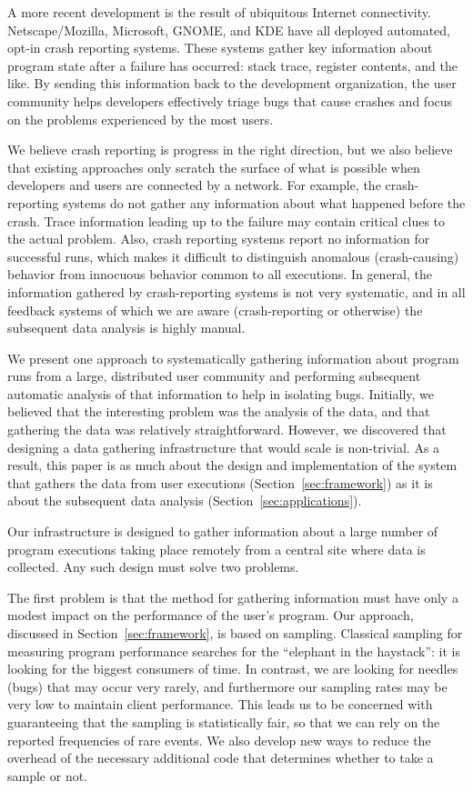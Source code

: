 A more recent development is the result of ubiquitous Internet
connectivity.  Netscape/Mozilla, Microsoft, GNOME, and KDE have all
deployed automated, opt-in crash reporting systems.  These systems
gather key information about program state after a failure has
occurred: stack trace, register contents, and the like.  By sending
this information back to the development organization, the user
community helps developers effectively triage bugs that cause crashes
and focus on the problems experienced by the most users.

We believe crash reporting is progress in the right direction, but we
also believe that existing approaches only scratch the surface of what
is possible when developers and users are connected by a network.  For
example, the crash-reporting systems do not gather any information
about what happened before the crash.  Trace information leading up to
the failure may contain critical clues to the actual problem.  Also,
crash reporting systems report no information for successful runs,
which makes it difficult to distinguish anomalous (crash-causing)
behavior from innocuous behavior common to all executions.  In general, the
information gathered by crash-reporting systems is not very
systematic, and in all feedback systems of which we are aware
(crash-reporting or otherwise) the subsequent data analysis is highly
manual.

We present one approach to systematically gathering information about
program runs from a large, distributed user community and performing
subsequent automatic analysis of that information to help in isolating
bugs.  Initially, we believed that the interesting problem was the
analysis of the data, and that gathering the data was relatively
straightforward.  However, we discovered that designing a data
gathering infrastructure that would scale is non-trivial.  As a
result, this paper is as much about the design and implementation of
the system that gathers the data from user executions
(Section~\ref{sec:framework}) as it is about the subsequent data
analysis (Section~\ref{sec:applications}).

Our infrastructure is designed to gather information about a large
number of program executions taking place remotely from a central site
where data is collected.  Any such design must solve two problems.

The first problem is that the method for gathering information must
have only a modest impact on the performance of the user's program.
Our approach, discussed in Section~\ref{sec:framework}, is based on
sampling.  Classical sampling for measuring program performance
searches for the ``elephant in the haystack'': it is looking for the
biggest consumers of time.  In contrast, we are looking for needles
(bugs) that may occur very rarely, and furthermore our sampling rates
may be very low to maintain client performance.  This leads us to be
concerned with guaranteeing that the sampling is statistically fair,
so that we can rely on the reported frequencies of rare events.  We
also develop new ways to reduce the overhead of the necessary
additional code that determines whether to take a sample or not.

